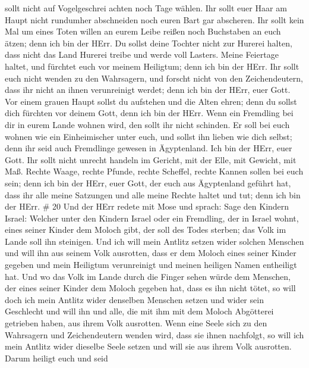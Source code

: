 sollt nicht auf Vogelgeschrei achten noch Tage wählen.  Ihr
sollt euer Haar am Haupt nicht rundumher abschneiden noch euren Bart gar
abscheren.  Ihr sollt kein Mal um eines Toten willen an
eurem Leibe reißen noch Buchstaben an euch ätzen; denn ich bin der HErr.
 Du sollst deine Tochter nicht zur Hurerei halten, dass
nicht das Land Hurerei treibe und werde voll Lasters. 
Meine Feiertage haltet, und fürchtet euch vor meinem Heiligtum; denn ich
bin der HErr.  Ihr sollt euch nicht wenden zu den
Wahrsagern, und forscht nicht von den Zeichendeutern, dass ihr nicht an
ihnen verunreinigt werdet; denn ich bin der HErr, euer Gott.
 Vor einem grauen Haupt sollst du aufstehen und die Alten
ehren; denn du sollst dich fürchten vor deinem Gott, denn ich bin der
HErr.  Wenn ein Fremdling bei dir in eurem Lande wohnen
wird, den sollt ihr nicht schinden.  Er soll bei euch
wohnen wie ein Einheimischer unter euch, und sollst ihn lieben wie dich
selbst; denn ihr seid auch Fremdlinge gewesen in Ägyptenland. Ich bin
der HErr, euer Gott.  Ihr sollt nicht unrecht handeln im
Gericht, mit der Elle, mit Gewicht, mit Maß.  Rechte Waage,
rechte Pfunde, rechte Scheffel, rechte Kannen sollen bei euch sein; denn
ich bin der HErr, euer Gott, der euch aus Ägyptenland geführt hat,
 dass ihr alle meine Satzungen und alle meine Rechte haltet
und tut; denn ich bin der HErr. \# 20  Und der HErr redete
mit Mose und sprach:  Sage den Kindern Israel: Welcher unter
den Kindern Israel oder ein Fremdling, der in Israel wohnt, eines seiner
Kinder dem Moloch gibt, der soll des Todes sterben; das Volk im Lande
soll ihn steinigen.  Und ich will mein Antlitz setzen wider
solchen Menschen und will ihn aus seinem Volk ausrotten, dass er dem
Moloch eines seiner Kinder gegeben und mein Heiligtum verunreinigt und
meinen heiligen Namen entheiligt hat.  Und wo das Volk im
Lande durch die Finger sehen würde dem Menschen, der eines seiner Kinder
dem Moloch gegeben hat, dass es ihn nicht tötet,  so will
doch ich mein Antlitz wider denselben Menschen setzen und wider sein
Geschlecht und will ihn und alle, die mit ihm mit dem Moloch Abgötterei
getrieben haben, aus ihrem Volk ausrotten.  Wenn eine Seele
sich zu den Wahrsagern und Zeichendeutern wenden wird, dass sie ihnen
nachfolgt, so will ich mein Antlitz wider dieselbe Seele setzen und will
sie aus ihrem Volk ausrotten.  Darum heiligt euch und seid
